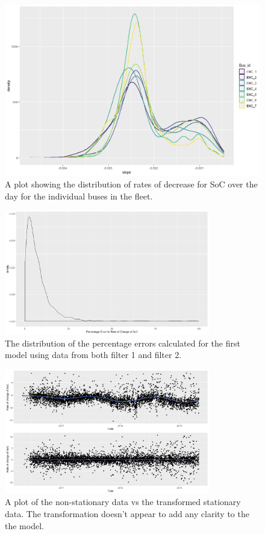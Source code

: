 \documentclass{article}
\begin{document}
\begin{figure}
    \centering
    \includegraphics[width = \textwidth]{EMC_slopes.png}
    \caption{A plot showing the distribution of rates of decrease for SoC over the day for the individual buses in the fleet.}
    \label{fig:emc_slopes}
\end{figure}

\begin{figure}[h]
    \centering
    \includegraphics[width = 0.8\textwidth]{Percentage_error_density_model_4.png}
    \caption{The distribution of the percentage errors calculated for the first model using data from both filter 1 and filter 2.}
    \label{fig:9}
\end{figure}

\begin{figure}[h]
    \centering
    \includegraphics[width = 0.8\textwidth]{Sationary_transform.png}
    \caption{A plot of the non-stationary data vs the transformed stationary data. The transformation doesn't appear to add any clarity to the the model.}
    \label{fig:transform}
\end{figure}
\end{document}
